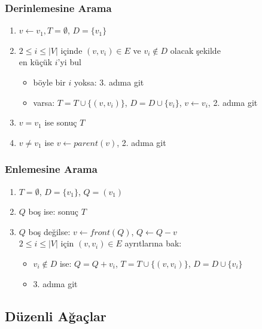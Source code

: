 \documentclass[dvipsnames]{beamer}
\theoremstyle{definition}
\theoremstyle{example}
\theoremstyle{plain}
\begin{document}
\begin{frame}
  \frametitle{Derinlemesine Arama}

  \begin{enumerate}
    \item $v \leftarrow v_1, T=\emptyset$, $D=\{v_1\}$

    \pause
    \item $2 \leq i \leq |V|$ içinde $(v,v_i) \in E$ ve $v_i \notin D$
      olacak şekilde\\
      en küçük $i$'yi bul
      \begin{itemize}
        \item böyle bir $i$ yoksa: 3. adıma git
        \item varsa: $T=T \cup \{(v,v_i)\}$, $D=D \cup \{v_i\}$,
          $v \leftarrow v_i$, 2. adıma git
      \end{itemize}

    \pause
    \item $v=v_1$ ise sonuç $T$

    \pause
    \item $v \neq v_1$ ise $v \leftarrow parent(v)$, 2. adıma git
  \end{enumerate}
\end{frame}

\begin{frame}
  \frametitle{Enlemesine Arama}

  \begin{enumerate}
    \item $T=\emptyset$, $D=\{v_1\}$, $Q=(v_1)$

    \pause
    \item $Q$ boş ise: sonuç $T$
    \item $Q$ boş değilse: $v \leftarrow front(Q)$, $Q \leftarrow Q - v$\\
      $2 \leq i \leq |V|$ için $(v,v_i) \in E$ ayrıtlarına bak:
    \begin{itemize}
      \item $v_i \notin D$ ise: $Q = Q + v_i$, $T = T \cup \{(v,v_i)\}$,
        $D=D \cup \{v_i\}$
       \item 3. adıma git
    \end{itemize}
  \end{enumerate}
\end{frame}

\subsection{Düzenli Ağaçlar}
\end{document}
